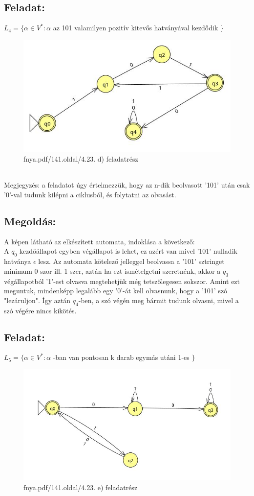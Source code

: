 \documentclass[12pt]{article}
\begin{document}
\subsection{Feladat:}
$ L_4 = \{ \alpha \in V^* : \alpha $ az 101 valamilyen pozitív kitevős hatványával kezdődik $\}$
\begin{figure}[h]
  \centering
  \includegraphics[width=0.7\linewidth]{img/d.jpg} 
  \caption{fnya.pdf/141.oldal/4.23. d) feladatrész}
  \label{fig:your_label}
\end{figure}
\\ Megjegyzés: a feladatot úgy értelmezzük, hogy az n-dik beolvasott '101' után csak '0'-val tudunk kilépni
a ciklusból, és folytatni az olvasást.
\subsection{Megoldás:}
A képen látható az elkészített automata, indoklása a következő: \\
A $q_0$ kezdőállapot egyben végállapot is lehet, ez azért van mivel '101' nulladik hatványa $\epsilon$ lesz.
Az automata kötelező jelleggel beolvassa a '101' sztringet minimum 0 szor ill. 1-szer, aztán ha ezt ismételgetni
szeretnénk, akkor a $q_3$ végállapotból '1'-est olvasva megtehetjük még tetszőlegesen sokszor. Amint ezt meguntuk,
mindenképp legalább egy '0'-át kell olvasnunk, hogy a '101' szó "lezáruljon". Így aztán $q_4$-ben, a szó végén
meg bármit tudunk olvasni, mivel a szó végére nincs kikötés.
\subsection{Feladat:}
$ L_5 = \{ \alpha \in V^* : \alpha $ -ban van pontosan k darab egymás utáni 1-es $\}$
\begin{figure}[h]
  \centering
  \includegraphics[width=0.7\linewidth]{img/e.jpg} 
  \caption{fnya.pdf/141.oldal/4.23. e) feladatrész}
  \label{fig:your_label}
\end{figure}
\end{document}
